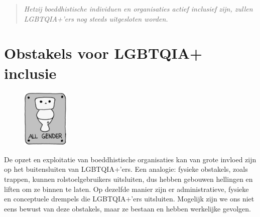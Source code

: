 \documentclass[12pt,openany]{book}
\begin{document}
\newpage
\thispagestyle{empty}
\begin{figure}[h]
    \centering
\end{figure}

\begin{quote}
\centering
\textit{\Large Hetzij boeddhistische individuen en organisaties actief inclusief zijn, zullen LGBTQIA+’ers nog steeds uitgesloten worden.}
\end{quote}

\chapter*{Obstakels voor LGBTQIA+ inclusie}

\begin{figure}
    \centering
    \includegraphics[width=0.2\textwidth]{16bw.png}
\end{figure}
De opzet en exploitatie van boeddhistische organisaties kan van grote invloed zijn op het buitensluiten van LGBTQIA+’ers. Een analogie: fysieke obstakels, zoals trappen, kunnen rolstoelgebruikers uitsluiten, dus hebben gebouwen hellingen en liften om ze binnen te laten. Op dezelfde manier zijn er administratieve, fysieke en conceptuele drempels die LGBTQIA+’ers uitsluiten. Mogelijk zijn we ons niet eens bewust van deze obstakels, maar ze bestaan en hebben werkelijke gevolgen.
\end{document}
